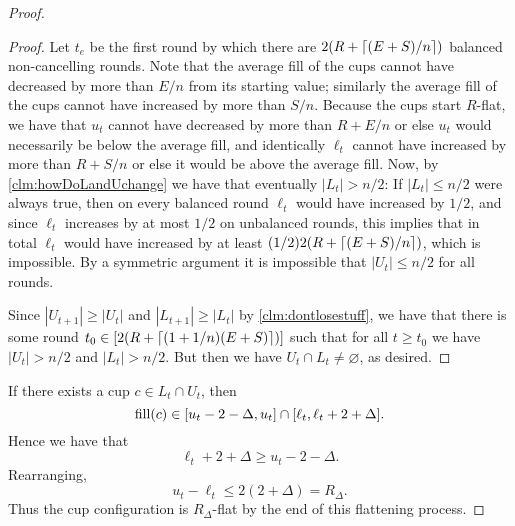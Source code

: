 \begin{proof}
\begin{proof}
  Let $t_e$ be the first round by which there are $2(R +
  \left\lceil (E+S)/n \right\rceil)$ balanced non-cancelling rounds. Note that the
  average fill of the cups cannot have decreased by more than
  $E/n$ from its starting value; similarly the average fill of
  the cups cannot have increased by more than $S/n$. Because the
  cups start $R$-flat, we have that $u_t$ cannot have decreased
  by more than $R + E/n$ or else $u_t$ would necessarily be below
  the average fill, and identically $\ell_t$ cannot have
  increased by more than $R + S/n$ or else it would be above the
  average fill. Now, by \cref{clm:howDoLandUchange} we have that
  eventually $|L_t| > n/2$: If $|L_t|\le n/2$ were always true,
  then on every balanced round $\ell_t$ would have increased by
  $1/2$, and since $\ell_t$ increases by at most $1/2$ on
  unbalanced rounds, this implies that in total $\ell_t$ would
  have increased by at least $(1/2)2(R + \left\lceil (E+S)/n \right\rceil)$, which
  is impossible. By a symmetric argument it is impossible that
  $|U_t| \le n/2$ for all rounds. 

  Since $|U_{t+1}|\ge |U_t|$ and $|L_{t+1}| \ge |L_t|$ by
  \cref{clm:dontlosestuff}, we have that there is some round $t_0
  \in [2(R + \left\lceil (1+1/n)(E+S) \right\rceil)]$ such that for all $t \ge t_0$
  we have $|U_t|> n/2$ and $|L_t|> n/2$. But then we
  have $U_t\cap L_t \neq \varnothing$, as desired.
  \end{proof}

  If there exists a cup $c \in L_t\cap U_t$, then 
  $$\operatorname{\textnormal{fill}}(c) \in [u_t-2-\Delta, u_t] \cap [\ell_t, \ell_t + 2 +
  \Delta].$$ Hence we have that $$\ell_t+2+\Delta \ge
  u_t-2-\Delta.$$ Rearranging, $$u_t - \ell_t \le 2(2+\Delta) =
  R_\Delta.$$ Thus the cup configuration is $R_\Delta$-flat by
  the end of this flattening process.

\end{proof}



